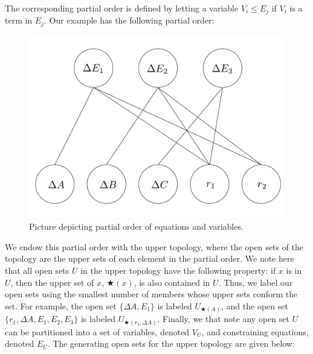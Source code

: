 \documentclass{article}
\begin{document}
The corresponding partial order is defined by letting a variable $V_i \leq E_j$
if $V_i$ is a term in $E_j$. Our example has the following partial order:

\begin{figure}[h]
	\centering
	\includegraphics[width=.5\textwidth,height=.3\textwidth]{./figs/poset.pdf}
	\caption{Picture depicting partial order of equations and variables.}
\end{figure}


We endow this partial order with the upper topology, where the 
open sets of the
topology are the upper sets of each element in the partial order. We note here
that all open sets $U$ in the upper topology have the following property: if $x$
is in $U$, then the upper set of $x$, $\bigstar(x)$, is also contained in $U$.
Thus, we label our open sets using the smallest number of members whose upper
sets conform the set. For example, the open set $\{\Delta A, E_1\}$ is labeled
$U_{\bigstar(A)}$, and the open set $\{r_1, \Delta A, E_1, E_2, E_3 \}$ is
labeled $U_{\bigstar(r_1, \Delta A)}$.  Finally, we that note any open set $U$
can be partitioned into a set of variables, denoted $V_U$, and constraining
equations, denoted $E_U$. The generating open sets for the upper topology are
given below:
\end{document}
